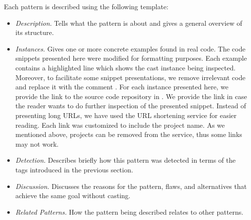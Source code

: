Each pattern is described using the following template:

\begin{itemize}
\item \textit{Description.}
Tells what the pattern is about and gives a general overview of its structure.
\item \textit{Instances.}
Gives one or more concrete examples found in real code.
The code snippets presented here were modified for formatting purposes.
Each example contains a highlighted line which shows the cast instance being inspected.
Moreover, to facilitate some snippet presentations,
we remove irrelevant code and replace it with the
comment \code{/* [...] */}.
For each instance presented here, we provide the link to the source code repository in \lgtm{}.
We provide the link in case the reader wants to do further inspection of the presented snippet.
Instead of presenting long \lgtm{} URLs, we have used the URL shortening service
\href{https://bitly.com/}{\bitly} for easier reading.
Each \bitly{} link was customized to include the project name.
As we mentioned above, projects can be removed from the \lgtm{} service,
thus some links may not work.
\item \textit{Detection.}
Describes briefly how this pattern was detected in terms of the tags introduced in the previous section.
\item \textit{Discussion.}
Discusses the reasons for the pattern, flaws, and alternatives that achieve the same goal without casting.
\item \textit{Related Patterns.}
How the pattern being described relates to other patterns.
\end{itemize}

\newcommand{\castpatternsection}[1]{\paragraph{#1.}}
\newenvironment{pattern}[1]{
    \newcommand{\nocc}{\csname n#1Pattern\endcsname{}}
    \newcommand{\noccsrc}{\csname n#1PatternSrc\endcsname{}}
    \newcommand{\noccgen}{\csname n#1PatternGen\endcsname{}}
    \newcommand{\nocctest}{\csname n#1PatternTest\endcsname{}}
    \newcommand{\pocc}{\csname p#1Pattern\endcsname{}}
    \newcommand{\instances}{\castpatternsection{Instances: \nocc{} (\pocc\%)}
    We found \noccsrc{} in application code, \nocctest{} in test code, and \noccgen{} in generated code.}
    \newcommand{\discussion}{\castpatternsection{Discussion}}
    \newcommand{\thisp}{\textsc{#1}}
    \subsection{\textsc{#1}}
    \label{pat:#1}
    \castpatternsection{Description}
}{}

